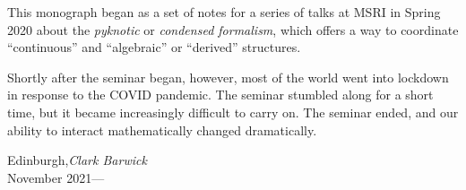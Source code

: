 
\preface

This monograph began as a set of notes for a series of talks at MSRI in Spring 2020 about the \emph{pyknotic} or \emph{condensed formalism},
which offers a way to coordinate \enquote{continuous} and \enquote{algebraic} or \enquote{derived} structures.

Shortly after the seminar began, however, most of the world went into lockdown in response to the COVID pandemic.
The seminar stumbled along for a short time, but it became increasingly difficult to carry on.
The seminar ended, and our ability to interact mathematically changed dramatically.

\vspace{\baselineskip}
\begin{flushright}\noindent
Edinburgh,\hfill {\it Clark Barwick \/}\\
November 2021\hfill{---}\\
\end{flushright}


